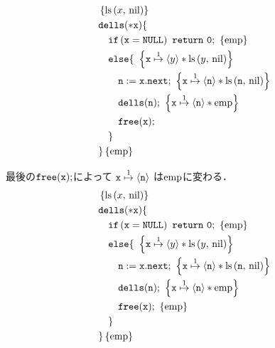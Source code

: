 \documentclass[a4paper, 10pt]{ltjsarticle}
\begin{document}
  \begin{align*}
   &  \left\{\mathprls{x}{\mathvalnil}\right\}\\
   & \mathprogramsy{dells(*x)} \{  \\
   &\quad \mathprogramsy{if\left(x = NULL\right)\ return\ 0;}\ \left\{\mathemp\right\}
   \\
     &\quad   \mathprogramsy{else \{}\  
   \left\{ \mathprogramsy{x} \mathpointer{1} \left\langle y \right\rangle * \mathprls{y}{\mathvalnil}  \right\} \\
     &\qquad  \mathprogramsy{n := x.next;}\  \left\{ \mathprogramsy{x} \mathpointer{1} \left\langle \mathprogramsy{n} \right\rangle * \mathprls{\mathprogramsy{n}}{\mathvalnil}  \right\} \\
     &\qquad  \mathprogramsy{dells(n);}\ \left\{ \mathprogramsy{x} \mathpointer{1} \left\langle \mathprogramsy{n} \right\rangle * \mathemp \right\} \\
      &\qquad  \mathprogramsy{free(x);}   %
   \\
      &\quad \mathprogramsy{\}} %
   \\
      &\mathprogramsy{\}} \left\{\mathemp\right\}
    \end{align*}

  最後の$\mathtt{free(x);}$によって
  $\mathtt{x} \mathrel{\overset{1}{\mapsto}} \left\langle \mathtt{n} \right\rangle$
  は$\mathrm{emp}$に変わる．
  \begin{align*}
   &  \left\{\mathop{\mathrm{ls}}\left(x{,}\ \mathrm{nil}\right)\right\}\\
   & \mathtt{dells(*x)} \{  \\
   &\quad \mathtt{if\left(x = NULL\right)\ return\ 0;}\ \left\{\mathrm{emp}\right\}
   \\
     &\quad   \mathtt{else \{}\  
   \left\{ \mathtt{x} \mathrel{\overset{1}{\mapsto}} \left\langle y \right\rangle * \mathop{\mathrm{ls}}\left(y{,}\ \mathrm{nil}\right)  \right\} \\
     &\qquad  \mathtt{n := x.next;}\  \left\{ \mathtt{x} \mathrel{\overset{1}{\mapsto}} \left\langle \mathtt{n} \right\rangle * \mathop{\mathrm{ls}}\left(\mathtt{n}{,}\ \mathrm{nil}\right)  \right\} \\
     &\qquad  \mathtt{dells(n);}\ \left\{ \mathtt{x} \mathrel{\overset{1}{\mapsto}} \left\langle \mathtt{n} \right\rangle * \mathrm{emp} \right\} \\
      &\qquad  \mathtt{free(x);}\ \left\{ \mathrm{emp} \right\} \\
      &\quad \mathtt{\}} \\
      &\mathtt{\}} \left\{\mathrm{emp}\right\}
  \end{align*}
  
\end{document}
